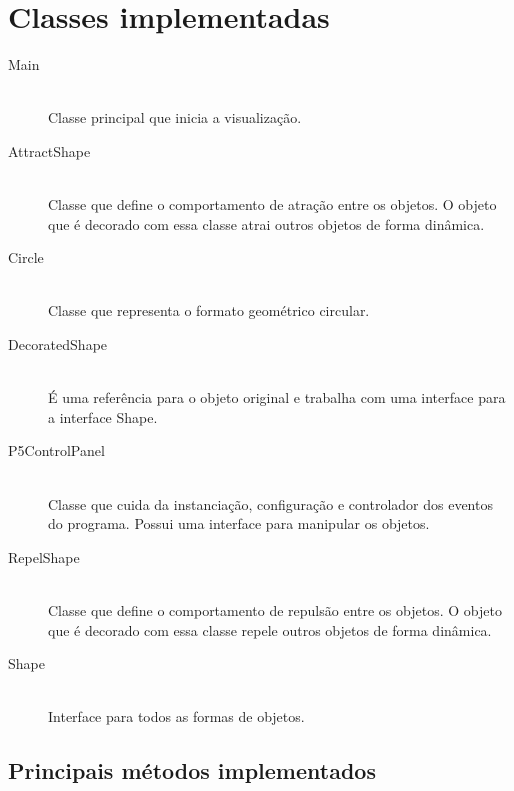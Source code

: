 \documentclass[12pt]{article}
\begin{document}
\section{Classes implementadas}
\label{classesimplementadas}
\vspace{0.4 true cm}
\begin{description}

\item[Main] \hfill \\
Classe principal que inicia a visualização.
\vspace{0.4 true cm}

\item[AttractShape] \hfill \\
Classe que define o comportamento de atração entre os objetos. O objeto que é decorado com essa classe atrai outros objetos de forma dinâmica.
\vspace{0.4 true cm}

\item[Circle] \hfill \\
Classe que representa o formato geométrico circular.
\vspace{0.4 true cm}

\item[DecoratedShape] \hfill \\
É uma referência para o objeto original e trabalha com uma interface para a interface Shape.
\vspace{0.4 true cm}

\item[P5ControlPanel] \hfill \\
Classe que cuida da instanciação, configuração e controlador dos eventos do programa. Possui uma interface para manipular os objetos.
\vspace{0.4 true cm}

\item[RepelShape] \hfill \\
Classe que define o comportamento de repulsão entre os objetos. O objeto que é decorado com essa classe repele outros objetos de forma dinâmica.
\vspace{0.4 true cm}

\item[Shape] \hfill \\
Interface para todos as formas de objetos.

\end{description}

\subsection{Principais métodos implementados}
\end{document}
